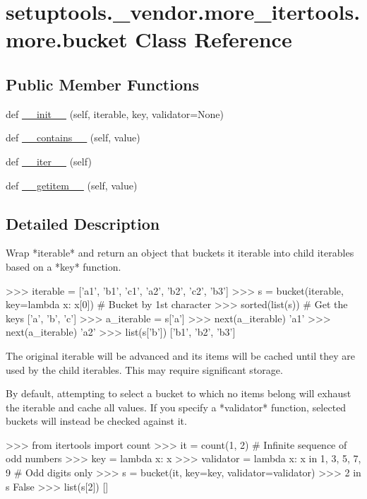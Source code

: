 \hypertarget{classsetuptools_1_1__vendor_1_1more__itertools_1_1more_1_1bucket}{}\section{setuptools.\+\_\+vendor.\+more\+\_\+itertools.\+more.\+bucket Class Reference}
\label{classsetuptools_1_1__vendor_1_1more__itertools_1_1more_1_1bucket}
\subsection*{Public Member Functions}
\begin{DoxyCompactItemize}
\item 
def \hyperlink{classsetuptools_1_1__vendor_1_1more__itertools_1_1more_1_1bucket_a9b4eb8476f30f10bc226348c769d2076}{\+\_\+\+\_\+init\+\_\+\+\_\+} (self, iterable, key, validator=None)
\item 
def \hyperlink{classsetuptools_1_1__vendor_1_1more__itertools_1_1more_1_1bucket_ad974f2d5637bde051b986293bf5ab218}{\+\_\+\+\_\+contains\+\_\+\+\_\+} (self, value)
\item 
def \hyperlink{classsetuptools_1_1__vendor_1_1more__itertools_1_1more_1_1bucket_aa6589cb0a728c0004b3a467c650e1bb5}{\+\_\+\+\_\+iter\+\_\+\+\_\+} (self)
\item 
def \hyperlink{classsetuptools_1_1__vendor_1_1more__itertools_1_1more_1_1bucket_a58742d4385e35bf6a56ffd899a758cb0}{\+\_\+\+\_\+getitem\+\_\+\+\_\+} (self, value)
\end{DoxyCompactItemize}


\subsection{Detailed Description}
\begin{DoxyVerb}Wrap *iterable* and return an object that buckets it iterable into
child iterables based on a *key* function.

    >>> iterable = ['a1', 'b1', 'c1', 'a2', 'b2', 'c2', 'b3']
    >>> s = bucket(iterable, key=lambda x: x[0])  # Bucket by 1st character
    >>> sorted(list(s))  # Get the keys
    ['a', 'b', 'c']
    >>> a_iterable = s['a']
    >>> next(a_iterable)
    'a1'
    >>> next(a_iterable)
    'a2'
    >>> list(s['b'])
    ['b1', 'b2', 'b3']

The original iterable will be advanced and its items will be cached until
they are used by the child iterables. This may require significant storage.

By default, attempting to select a bucket to which no items belong  will
exhaust the iterable and cache all values.
If you specify a *validator* function, selected buckets will instead be
checked against it.

    >>> from itertools import count
    >>> it = count(1, 2)  # Infinite sequence of odd numbers
    >>> key = lambda x: x %
    >>> validator = lambda x: x in {1, 3, 5, 7, 9}  # Odd digits only
    >>> s = bucket(it, key=key, validator=validator)
    >>> 2 in s
    False
    >>> list(s[2])
    []\end{DoxyVerb}
 

